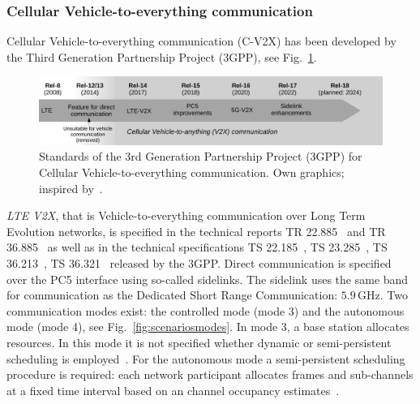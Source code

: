 \subsubsection{Cellular Vehicle-to-everything communication}
Cellular Vehicle-to-everything communication (C-V2X) has been developed by the Third Generation Partnership Project (3GPP), see Fig.~\ref{fig:overviewofreleases3gpp}. 


\begin{figure}[hbt!]
\includegraphics[width=\textwidth]{../figures/state-of-the-art/mobilecommunication/release3gpp.pdf} 
\caption{Standards of the 3rd Generation Partnership Project (3GPP) for Cellular Vehicle-to-everything communication. Own graphics; inspired by~\cite{bazzi-2021-com}.}
\label{fig:overviewofreleases3gpp}
\end{figure}


\textit{LTE V2X}, that is Vehicle-to-everything communication over Long Term Evolution networks, is specified in the technical reports TR 22.885~\cite{3gpp-22.885-2015-com} and TR 36.885~\cite{3gpp-36.885-2016-com} as well as in the technical specifications TS 22.185~\cite{3gpp-22.185-2020-com}, TS 23.285~\cite{3gpp-23.285-2020-com}, TS 36.213~\cite{3gpp-36.213-2020-com}, TS 36.321~\cite{3gpp-36.321-2020-com} released by the 3GPP. Direct communication is specified over the PC5 interface using so-called sidelinks. The sidelink uses the same band for communication as the Dedicated Short Range Communication: $5.9\,\text{GHz}$.
Two communication modes exist: the controlled mode (mode 3) and the autonomous mode (mode 4), see Fig.~\ref{fig:scenariosmodes}. In mode 3, a base station allocates resources. In this mode it is not specified whether dynamic or semi-persistent scheduling is employed~\cite{bazzi-2021-com}. 
For the autonomous mode a semi-persistent scheduling procedure is required: each network participant allocates frames and sub-channels at a fixed time interval based on an channel occupancy estimates~\cite{bazzi-2021-com}. 



